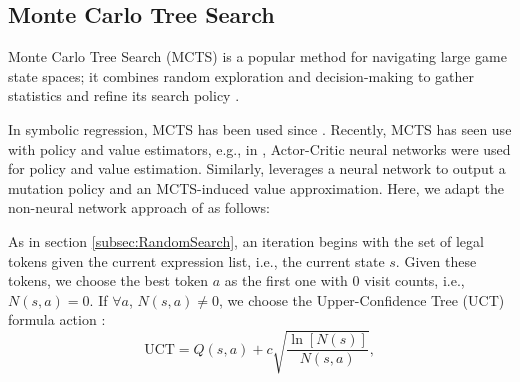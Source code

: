 \documentclass[runningheads]{llncs}
\begin{document}




\subsection{Monte Carlo Tree Search}\label{subsec:MonteCarlo TreeSearch}

Monte Carlo Tree Search (MCTS) is a popular method for navigating large game state spaces; it combines random exploration and decision-making to gather statistics and refine its search policy \cite{Silver2016} \cite{Swiechowski2023}.

In symbolic regression, MCTS has been used since \cite{CazenaveMCTS}. Recently, MCTS has seen use with policy and value estimators, e.g., in \cite{Lu2021}, Actor-Critic neural networks were used for policy and value estimation. Similarly, \cite{10.5555/3618408.3619047} leverages a neural network to output a mutation policy and an MCTS-induced value approximation. Here, we adapt the non-neural network approach of \cite{sun2023symbolic} as follows:
\par As in section \ref{subsec:RandomSearch}, an iteration begins with the set of legal tokens given the current expression list, i.e., the current state $s$. Given these tokens, we choose the best token $a$ as the first one with 0 visit counts, i.e., $N(s,a) = 0$.  If $\forall a$, $N(s,a) \neq 0$, we choose the Upper-Confidence Tree (UCT) formula action \cite{sun2023symbolic}:
\begin{equation}
\mathrm{UCT} = Q(s,a) + c\sqrt{\frac{\ln{[N(s)]}}{N(s,a)}}, \label{eq:UCT_formula}
\end{equation}
\end{document}
